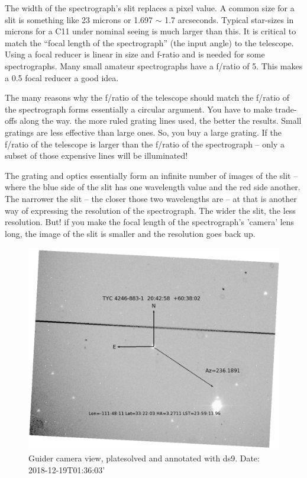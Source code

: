\documentclass[letter,11pt,oneside]{article}
\begin{document}
The width of the spectrograph's slit replaces a pixel value. A common
size for a slit is something like 23 microns or  1.697 $\sim$ 1.7
arcseconds. Typical star-sizes in microns for a C11 under nominal
seeing is much larger than this. It is critical to match the ``focal
length of the spectrograph'' (the input angle) to the telescope. Using
a focal reducer is linear in size and f-ratio and is needed for some
spectrographs. Many small amateur spectrographs have a f/ratio of
5. This makes a 0.5 focal reducer a good idea. 

The many reasons why the f/ratio of the telescope should
match the f/ratio of the spectrograph forms essentially a circular
argument. You have to make trade-offs along the way. the more 
ruled grating lines used, the better the results. Small gratings
are less effective than large ones. So, you buy a large grating.
If the f/ratio of the telescope is larger than the f/ratio
of the spectrograph -- only a subset of those expensive lines
will be illuminated!

The grating and optics essentially form an infinite number of images
of the slit -- where the blue side of the slit has one wavelength
value and the red side another. The narrower the slit -- the closer
those two wavelengths are -- at that is another way of expressing
the resolution of the spectrograph. The wider the slit, the less
resolution. But! if you make the focal length of the spectrograph's
'camera' lens long, the image of the slit is smaller and the resolution
goes back up. 


\begin{figure}[h!]
\centering
\includegraphics[width=\textwidth]{images/PAOverviewds9.jpeg}
\caption{Guider camera view, platesolved and annotated with ds9.
 Date: 2018-12-19T01:36:03'} %
\label{figure:Guidercameraview}
\end{figure}
\end{document}
